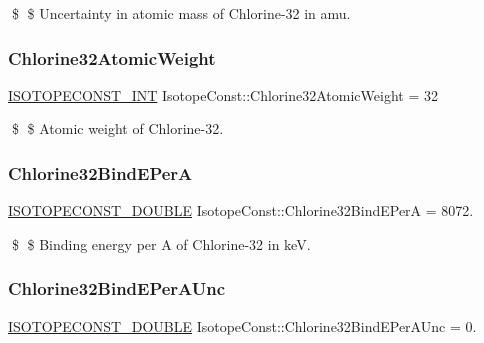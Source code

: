 \$ \$ Uncertainty in atomic mass of Chlorine-\/32 in amu. \mbox{\label{group___isotope_const-_chlorine-_cl32_ga48b4ad7d2418069cfed40b588e68d7d4}} 
\subsubsection{\texorpdfstring{Chlorine32\+Atomic\+Weight}{Chlorine32AtomicWeight}}
{\footnotesize\ttfamily \mbox{\hyperlink{group___isotope_const-_macros_ga5f18360b3e99483a35c32d789e62621c}{I\+S\+O\+T\+O\+P\+E\+C\+O\+N\+S\+T\+\_\+\+I\+NT}} Isotope\+Const\+::\+Chlorine32\+Atomic\+Weight = 32}

\$ \$ Atomic weight of Chlorine-\/32. \mbox{\label{group___isotope_const-_chlorine-_cl32_gaf539510dd969758a2959fa1eb339768f}} 
\subsubsection{\texorpdfstring{Chlorine32\+Bind\+E\+PerA}{Chlorine32BindEPerA}}
{\footnotesize\ttfamily \mbox{\hyperlink{group___isotope_const-_macros_ga8f45a7272ce02c0b4c65c44636ed719a}{I\+S\+O\+T\+O\+P\+E\+C\+O\+N\+S\+T\+\_\+\+D\+O\+U\+B\+LE}} Isotope\+Const\+::\+Chlorine32\+Bind\+E\+PerA = 8072.}

\$ \$ Binding energy per A of Chlorine-\/32 in keV. \mbox{\label{group___isotope_const-_chlorine-_cl32_ga4d5a3101afc2d9f1379f40eec4b5ea49}} 
\subsubsection{\texorpdfstring{Chlorine32\+Bind\+E\+Per\+A\+Unc}{Chlorine32BindEPerAUnc}}
{\footnotesize\ttfamily \mbox{\hyperlink{group___isotope_const-_macros_ga8f45a7272ce02c0b4c65c44636ed719a}{I\+S\+O\+T\+O\+P\+E\+C\+O\+N\+S\+T\+\_\+\+D\+O\+U\+B\+LE}} Isotope\+Const\+::\+Chlorine32\+Bind\+E\+Per\+A\+Unc = 0.}

